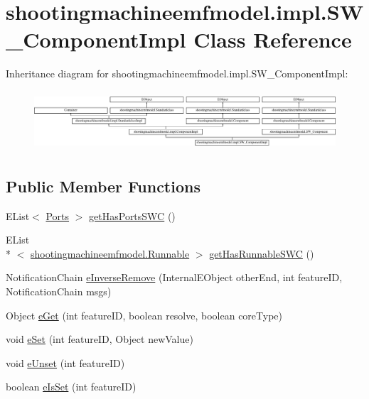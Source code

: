 \hypertarget{classshootingmachineemfmodel_1_1impl_1_1_s_w___component_impl}{\section{shootingmachineemfmodel.\-impl.\-S\-W\-\_\-\-Component\-Impl Class Reference}
\label{classshootingmachineemfmodel_1_1impl_1_1_s_w___component_impl}
}
Inheritance diagram for shootingmachineemfmodel.\-impl.\-S\-W\-\_\-\-Component\-Impl\-:\begin{figure}[H]
\begin{center}
\leavevmode
\includegraphics[height=2.272727cm]{classshootingmachineemfmodel_1_1impl_1_1_s_w___component_impl}
\end{center}
\end{figure}
\subsection*{Public Member Functions}
\begin{DoxyCompactItemize}
\item 
E\-List$<$ \hyperlink{interfaceshootingmachineemfmodel_1_1_ports}{Ports} $>$ \hyperlink{classshootingmachineemfmodel_1_1impl_1_1_s_w___component_impl_a506d6529374f47b28cb78ec920852c3b}{get\-Has\-Ports\-S\-W\-C} ()
\item 
E\-List\\*
$<$ \hyperlink{interfaceshootingmachineemfmodel_1_1_runnable}{shootingmachineemfmodel.\-Runnable} $>$ \hyperlink{classshootingmachineemfmodel_1_1impl_1_1_s_w___component_impl_afb6ead0797fbb25059fe4a7a507cfb3e}{get\-Has\-Runnable\-S\-W\-C} ()
\item 
Notification\-Chain \hyperlink{classshootingmachineemfmodel_1_1impl_1_1_s_w___component_impl_aac675403ec8b7edd732fbcdc318870c8}{e\-Inverse\-Remove} (Internal\-E\-Object other\-End, int feature\-I\-D, Notification\-Chain msgs)
\item 
Object \hyperlink{classshootingmachineemfmodel_1_1impl_1_1_s_w___component_impl_ab9a7768db026efa139cea5f5db7204eb}{e\-Get} (int feature\-I\-D, boolean resolve, boolean core\-Type)
\item 
void \hyperlink{classshootingmachineemfmodel_1_1impl_1_1_s_w___component_impl_a38a49de38ae9e7d97ff605849e9fab8a}{e\-Set} (int feature\-I\-D, Object new\-Value)
\item 
void \hyperlink{classshootingmachineemfmodel_1_1impl_1_1_s_w___component_impl_a293670ea83f8b059dedf62e07c4df992}{e\-Unset} (int feature\-I\-D)
\item 
boolean \hyperlink{classshootingmachineemfmodel_1_1impl_1_1_s_w___component_impl_ac04ae39c3f817cd1b61d4b855e52c0c3}{e\-Is\-Set} (int feature\-I\-D)
\end{DoxyCompactItemize}
